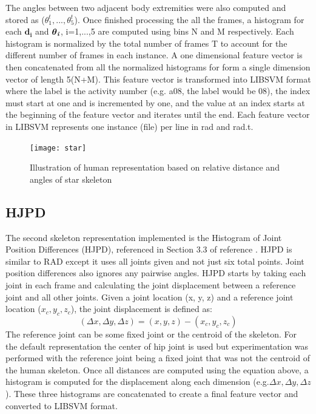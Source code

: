 \documentclass[11pt,nocopyrightspace]{config}
\begin{document}
The angles between two adjacent body extremities were also computed and stored as ($\theta_1^t,...,\theta_5^t$). Once finished processing the all the frames, a histogram for each \emph{$\textbf{d}_\textbf{i}$} and $ \boldsymbol\theta_\textbf{\emph{i}}$, i=1,...,5 are computed using bins N and M respectively. Each histogram is normalized by the total number of frames T to account for the different number of frames in each instance. A one dimensional feature vector is then concatenated from all the normalized histograms for form a single dimension vector of length 5(N+M). This feature vector is transformed into LIBSVM format where the label is the activity number (e.g. a08, the label would be 08), the index must start at one and is incremented by one, and the value at an index starts at the beginning of the feature vector and iterates until the end. Each feature vector in LIBSVM represents one instance (file) per line in rad and rad.t.

\begin{figure}
	\centering
	\texttt{[image: star]}
	\caption{Illustration of human representation based on relative distance and angles of star skeleton}
	\label{fig:star}
\end{figure}

\subsection{HJPD}

The second skeleton representation implemented is the Histogram of Joint Position Differences (HJPD), referenced in Section 3.3 of reference \cite{hjpdPaper}. HJPD is similar to RAD except it uses all joints given and not just six total points. Joint position differences also ignores any pairwise angles. HJPD starts by taking each joint in each frame and calculating the joint displacement between a reference joint and all other joints. Given a joint location (x, y, z) and a reference joint location ($x_c, y_c, z_c$), the joint displacement is defined as:
\begin{equation}
(\Delta{x}, \Delta{y}, \Delta{z}) = (x, y, z) - (x_c, y_c, z_c)
\end{equation}
The reference joint can be some fixed joint or the centroid of the skeleton. For the default representation the center of hip joint is used but experimentation was performed with the reference joint being a fixed joint that was not the centroid of the human skeleton. Once all distances are computed using the equation above, a histogram is computed for the displacement along each dimension (e.g.$ \Delta{x}, \Delta{y}, \Delta{z}$). These three histograms are concatenated to create a final feature vector and converted to LIBSVM format.
\end{document}
